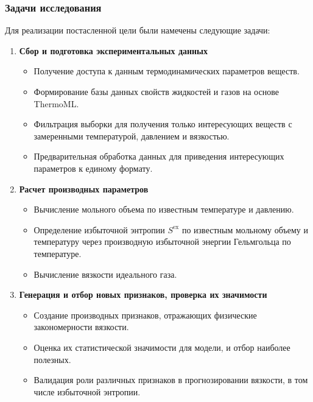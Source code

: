 \documentclass[a4paper,12pt]{article}
\begin{document}
    \subsubsection{Задачи исследования}
    
    Для реализации постасленной цели были намечены следующие задачи:
    
    \begin{enumerate}
      \item \textbf{Сбор и подготовка экспериментальных данных}{
        \begin{itemize}
          \item Получение доступа к данным термодинамических параметров веществ.
          \item Формирование базы данных свойств жидкостей и газов на основе ThermoML.
          \item Фильтрация выборки для получения только интересующих веществ с замеренными температурой, давлением и вязкостью.
          \item Предварительная обработка данных для приведения интересующих параметров к единому формату.
        \end{itemize}
      }
    
        \item \textbf{Расчет производных параметров}
        \begin{itemize}
            \item Вычисление мольного объема по известным температуре и давлению.
            \item Определение избыточной энтропии $S^{\text{ex}}$ по известным мольному объему и температуру через производную избыточной энергии Гельмгольца по температуре.
            \item Вычисление вязкости идеального газа.
        \end{itemize}
    
        \item \textbf{Генерация и отбор новых признаков, проверка их значимости}
        \begin{itemize}
            \item Создание производных признаков, отражающих физические закономерности вязкости.
            \item Оценка их статистической значимости для модели, и отбор наиболее полезных.
            \item Валидация роли различных признаков в прогнозировании вязкости, в том числе избыточной энтропии.
        \end{itemize}
    

\end{enumerate}
\end{document}
